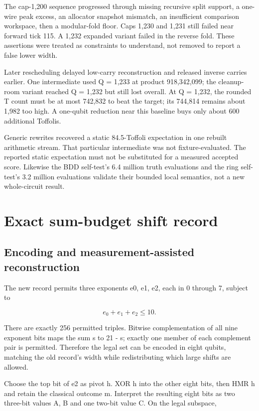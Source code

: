 \documentclass[11pt,letterpaper]{article}
\begin{document}
The cap-1,200 sequence progressed through missing recursive split support, a one-wire peak excess, an allocator snapshot mismatch, an insufficient comparison workspace, then a modular-fold floor. Caps 1,230 and 1,231 still failed near forward tick 115. A 1,232 expanded variant failed in the reverse fold. These assertions were treated as constraints to understand, not removed to report a false lower width.


Later rescheduling delayed low-carry reconstruction and released inverse carries earlier. One intermediate used Q = 1,233 at product 918,342,099; the cleanup-room variant reached Q = 1,232 but still lost overall. At Q = 1,232, the rounded T count must be at most 742,832 to beat the target; its 744,814 remains about 1,982 too high. A one-qubit reduction near this baseline buys only about 600 additional Toffolis.


Generic rewrites recovered a static 84.5-Toffoli expectation in one rebuilt arithmetic stream. That particular intermediate was not fixture-evaluated. The reported static expectation must not be substituted for a measured accepted score. Likewise the BDD self-test's 6.4 million truth evaluations and the ring self-test's 3.2 million evaluations validate their bounded local semantics, not a new whole-circuit result.


\section{Exact sum-budget shift record}

\subsection{Encoding and measurement-assisted reconstruction}

The new record permits three exponents e0, e1, e2, each in 0 through 7, subject to


\[
e_0+e_1+e_2\leq 10.
\]

There are exactly 256 permitted triples. Bitwise complementation of all nine exponent bits maps the sum s to 21 - s; exactly one member of each complement pair is permitted. Therefore the legal set can be encoded in eight qubits, matching the old record's width while redistributing which large shifts are allowed.


Choose the top bit of e2 as pivot h. XOR h into the other eight bits, then HMR h and retain the classical outcome m. Interpret the resulting eight bits as two three-bit values A, B and one two-bit value C. On the legal subspace,
\end{document}
